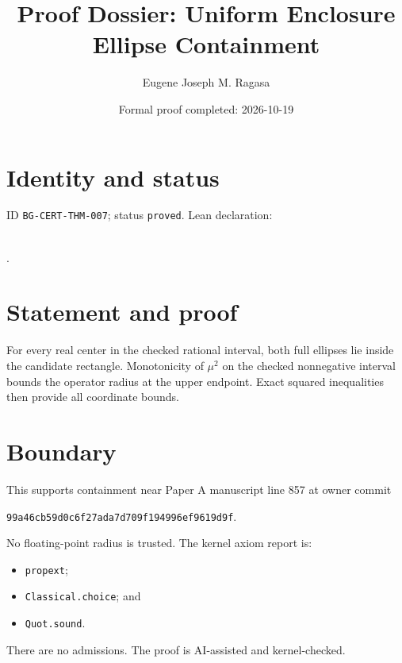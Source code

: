 \documentclass[11pt]{article}
\title{Proof Dossier: Uniform Enclosure Ellipse Containment}\author{Eugene Joseph M. Ragasa}\date{Formal proof completed: 2026-10-19}
\begin{document}
\maketitle
\section{Identity and status}
ID \texttt{BG-CERT-THM-007}; status \texttt{proved}. Lean declaration:
\par{}\\
{\tiny{}}.
\section{Statement and proof}
For every real center in the checked rational interval, both full ellipses lie inside the
candidate rectangle. Monotonicity of $\mu^2$ on the checked nonnegative interval bounds
the operator radius at the upper endpoint. Exact squared inequalities then provide all
coordinate bounds.
\section{Boundary}
This supports containment near Paper A manuscript line 857 at owner commit
\begin{center}\small\texttt{99a46cb59d0c6f27ada7d709f194996ef9619d9f}.\end{center}
No floating-point radius is trusted. The kernel axiom report is:
\begin{itemize}
\item \texttt{propext};
\item \texttt{Classical.choice}; and
\item \texttt{Quot.sound}.
\end{itemize}
There are no admissions. The proof is AI-assisted and kernel-checked.
\end{document}
